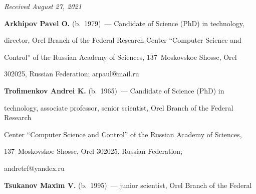 \vspace*{-6pt}





\hfill{\small\textit{Received August 27, 2021}} 





\vspace*{-16pt} 


      


      \Contr


      


      \vspace*{-4pt}


      


\noindent


\textbf{Arkhipov Pavel O.} (b.\ 1979)~--- Candidate of Science (PhD) in technology, 


director, Orel Branch of the Federal Research Center ``Computer Science and 


Control'' of the Russian Academy of Sciences, 137~Moskovskoe Shosse, Orel 


302025, Russian Federation; \mbox{arpaul@mail.ru}





\vspace*{3pt}


      


      \noindent


\textbf{Trofimenkov Andrei K.} (b.\ 1965)~--- Candidate of Science (PhD) in 


technology, associate professor, senior scientist, Orel Branch of the Federal Research 


Center ``Computer Science and Control'' of the Russian Academy of Sciences, 


137~Moskovskoe Shosse, Orel 302025, Russian Federation; 


\mbox{andretrf@yandex.ru}





\vspace*{3pt}


      


      \noindent


\textbf{Tsukanov Maxim V.} (b.\ 1995)~--- junior scientist, Orel Branch of the Federal 


